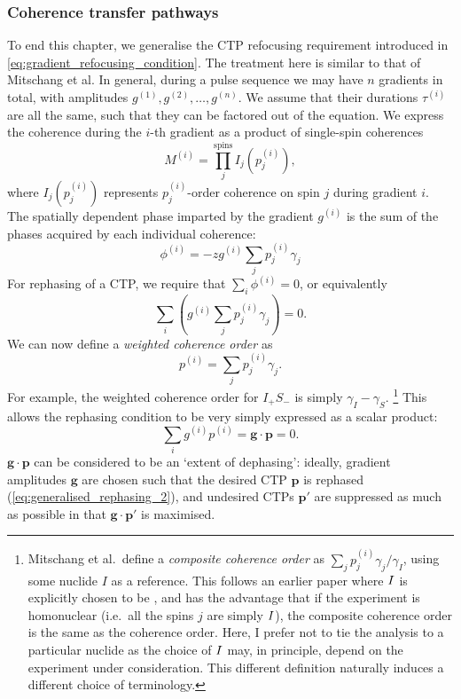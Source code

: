 \subsubsection{Coherence transfer pathways}

To end this chapter, we generalise the CTP refocusing requirement introduced in \cref{eq:gradient_refocusing_condition}.
The treatment here is similar to that of Mitschang et al.\autocite{Mitschang1995JCP}
In general, during a pulse sequence we may have $n$ gradients in total, with amplitudes $g^{(1)}, g^{(2)}, \ldots, g^{(n)}$.
We assume that their durations $\tau^{(i)}$ are all the same, such that they can be factored out of the equation.
We express the coherence during the $i$-th gradient as a product of single-spin coherences
\begin{equation}
    \label{eq:generalised_coherence}
    M^{(i)} = \prod_j^{\text{spins}} I_j(p_j^{(i)}),
\end{equation}
where $I_j(p_j^{(i)})$ represents $p_j^{(i)}$-order coherence on spin $j$ during gradient $i$.
The spatially dependent phase imparted by the gradient $g^{(i)}$ is the sum of the phases acquired by each individual coherence:
\begin{equation}
    \label{eq:generalised_phase}
    \phi^{(i)} = -zg^{(i)} \sum_j p_j^{(i)}\gamma_j
\end{equation}
For rephasing of a CTP, we require that $\sum_i \phi^{(i)} = 0$, or equivalently
\begin{equation}
    \label{eq:generalised_rephasing_1}
    \sum_i \left( g^{(i)}\sum_j p_j^{(i)}\gamma_j\right) = 0.
\end{equation}
We can now define a \textit{weighted coherence order}\autocite{John1991JMR} as
\begin{equation}
    \label{eq:weighted_coherence_order}
    p^{(i)} = \sum_j p_j^{(i)}\gamma_j.
\end{equation}
For example, the weighted coherence order for $I_+S_-$ is simply $\gamma_I - \gamma_S$.%
\footnote{Mitschang et al.\ define a \textit{composite coherence order} as $\sum_j p_j^{(i)}\gamma_j/\gamma_I$, using some nuclide $I$ as a reference. This follows an earlier paper\autocite{John1991JMR} where $I\/$ is explicitly chosen to be \proton{}, and has the advantage that if the experiment is homonuclear (i.e.\ all the spins $j$ are simply $I\/$), the composite coherence order is the same as the coherence order. Here, I prefer not to tie the analysis to a particular nuclide as the choice of $I\/$ may, in principle, depend on the experiment under consideration. This different definition naturally induces a different choice of terminology.}
This allows the rephasing condition to be very simply expressed as a scalar product:
\begin{equation}
    \label{eq:generalised_rephasing_2}
    \sum_i g^{(i)} p^{(i)} = \symbf{g} \cdot \symbf{p} = 0.
\end{equation}
$\symbf{g} \cdot \symbf{p}$ can be considered to be an `extent of dephasing': ideally, gradient amplitudes $\symbf{g}$ are chosen such that the desired CTP $\symbf{p}$ is rephased (\cref{eq:generalised_rephasing_2}), and undesired CTPs $\symbf{p}'$ are suppressed as much as possible in that $\symbf{g} \cdot \symbf{p}'$ is maximised.
